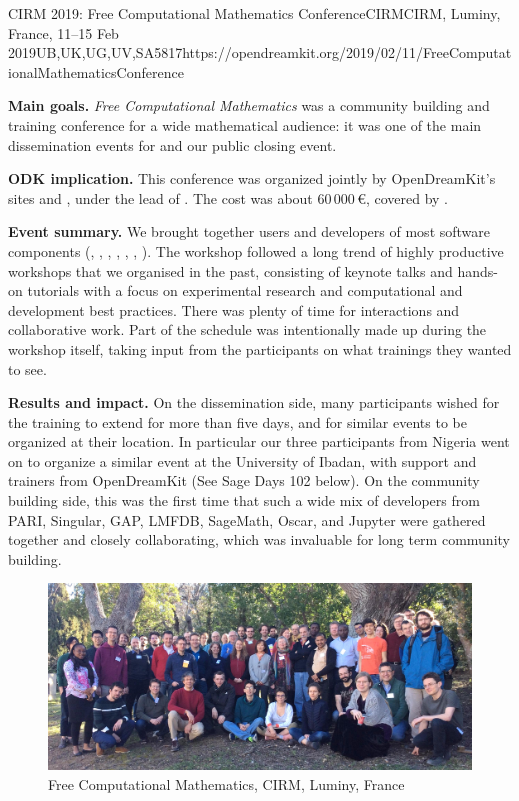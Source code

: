 \begin{event}{CIRM 2019: Free Computational Mathematics Conference}{CIRM}{CIRM, Luminy, France, 11--15 Feb 2019}{UB,UK,UG,UV,SA}{58}{17}{https://opendreamkit.org/2019/02/11/FreeComputationalMathematicsConference}

\textbf{Main goals.} \emph{Free Computational Mathematics} was
a community building and training conference for a wide mathematical audience:
it was one of the main dissemination events for \ODK and our public closing event.

\textbf{ODK implication.} This conference was organized jointly by
OpenDreamKit's sites  and , under the lead of .
The cost was about 60\,000\,\euro, covered by .

\textbf{Event summary.}
We brought together users and developers of most \ODK software components
(\GAP, \Jupyter, \Linbox, \MPIR, \PariGP, \Sage, \Singular).
The workshop followed a long trend of highly productive workshops that we organised in the past,
consisting of keynote talks and hands-on tutorials with a focus on experimental research
and computational and development best practices.
There was plenty of time for interactions and collaborative work.
Part of the schedule was intentionally made up during the workshop itself,
taking input from the participants on what trainings they wanted to see.


\textbf{Results and impact.} On the dissemination side, many
participants wished for the training to extend for more than five
days, and for similar events to be organized at their location. In
particular our three participants from Nigeria went on to organize a
similar event at the University of Ibadan, with support and trainers
from OpenDreamKit (See Sage Days 102 below). On the community building
side, this was the first time that such a wide mix of developers from
PARI, Singular, GAP, LMFDB, SageMath, Oscar, and Jupyter were gathered
together and closely collaborating, which was invaluable for long term
community building.

\begin{figure}[ht]
  \includegraphics[width=.75\textwidth]{CIRM.jpg}
  \caption*{Free Computational Mathematics, CIRM, Luminy, France}
\end{figure}

\end{event}
